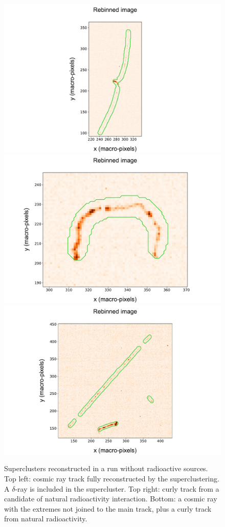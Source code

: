 \begin{figure}[ht]
  \begin{center}
     \includegraphics[width=0.49\linewidth]{figures/pic_run02156_ev49_sc_3D_paper}
     \includegraphics[width=0.49\linewidth]{figures/pic_run02156_ev641_sc_3D_paper} \\
     \includegraphics[width=0.6\linewidth]{figures/pic_run02156_ev631_sc_3D_paper}
     \caption{Superclusters reconstructed in a run without radioactive
       sources.  Top left: cosmic ray track fully reconstructed by the \gac
       superclustering. A $\delta$-ray is included in the supercluster. Top right: curly track from a candidate of
       natural radioactivity interaction. Bottom: a cosmic ray with the
       extremes not joined to the main track, plus a curly track from
       natural radioactivity. \label{fig:super_clusters2}}
  \end{center}
\end{figure}
